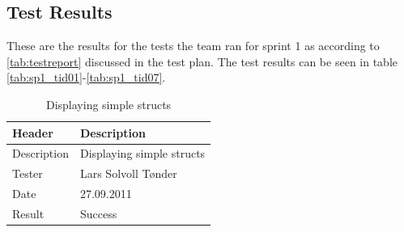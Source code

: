 \subsection{Test Results}
These are the results for the tests the team ran for sprint 1 as according to \autoref{tab:testreport} discussed in the test plan.
The test results can be seen in table \ref{tab:sp1_tid01}-\ref{tab:sp1_tid07}.
\begin{table}[!htb] \footnotesize \center
\caption{Supporting parameters for \Gls{c}-\gls{header} file \label{tab:sp1_tid01}}
\noindent{}
\end{table}

\begin{table}[!htb] \footnotesize \center
\caption{Supporting basic data types \label{tab:sp1_tid02}}
\noindent{}
\end{table}

\begin{table}[!htb] \footnotesize \center
\caption{Displaying simple \glspl{struct}  \label{tab:sp1_tid03}}
\begin{tabular}{l l}
	\toprule
	Header & Description \\
	\midrule
	Description & Displaying simple \glspl{struct} \\
	Tester & Lars Solvoll Tønder \\
	Date & 27.09.2011 \\
	Result & Success\\
	\bottomrule
\end{tabular}
\end{table}

